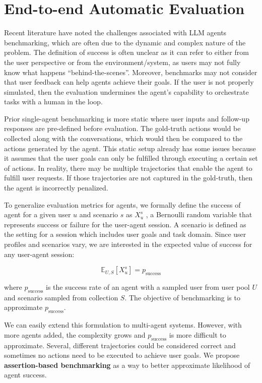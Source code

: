 \section{End-to-end Automatic Evaluation}
\label{sec:evaluation}

Recent literature have noted the challenges associated with LLM agents benchmarking, which are often due to the dynamic and complex nature of the problem. The definition of success is often unclear as it can refer to either from the user perspective or from the environment/system, as users may not fully know what happens “behind-the-scenes”.  Moreover, benchmarks may not consider that user feedback can help agents achieve their goals. If the user is not properly simulated, then the evaluation undermines the agent’s capability to orchestrate tasks with a human in the loop.

Prior single-agent benchmarking is more static where user inputs and follow-up responses are pre-defined before evaluation. The gold-truth actions would be collected along with the conversations, which would then be compared to the actions generated by the agent. This static setup already has some issues because it assumes that the user goals can only be fulfilled through executing a certain set of actions. In reality, there may be multiple trajectories that enable the agent to fulfill user requests. If those trajectories are not captured in the gold-truth, then the agent is incorrectly penalized.

To generalize evaluation metrics for agents, we formally define the success of agent for a given user $u$ and scenario $s$ as $X_u^s$ , a Bernoulli random variable that represents success or failure for the user-agent session. A scenario is defined as the setting for a session which includes user goals and task domain. Since user profiles and scenarios vary, we are interested in the expected value of success for any user-agent session:

\begin{equation}
\mathbb{E}_{U,S}[X_u^s] = p_{\text{success}}    
\end{equation}


where $p_{\text{success}}$   is the success rate of an agent with a sampled user from user pool $U$ and scenario sampled from collection $S$.  The objective of benchmarking is to approximate $p_{\text{success}}$.

We can easily extend this formulation to multi-agent systems. However, with more agents added, the complexity grows and $p_{\text{success}}$ is more difficult to approximate. Several, different trajectories could be considered correct and sometimes no actions need to be executed to achieve user goals.  We propose \textbf{assertion-based benchmarking} as a way to better approximate likelihood of agent success.

